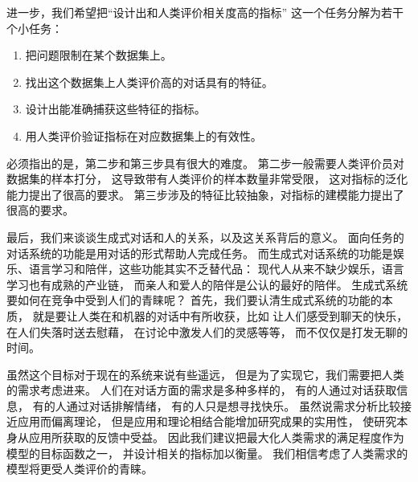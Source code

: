 进一步，我们希望把“设计出和人类评价相关度高的指标”
这一个任务分解为若干个小任务：
\begin{enumerate}
    \item 把问题限制在某个数据集上。
    \item 找出这个数据集上人类评价高的对话具有的特征。
    \item 设计出能准确捕获这些特征的指标。
    \item 用人类评价验证指标在对应数据集上的有效性。
\end{enumerate}

必须指出的是，第二步和第三步具有很大的难度。
第二步一般需要人类评价员对数据集的样本打分，
这导致带有人类评价的样本数量非常受限，
这对指标的泛化能力提出了很高的要求。
第三步涉及的特征比较抽象，对指标的建模能力提出了很高的要求。

最后，我们来谈谈生成式对话和人的关系，以及这关系背后的意义。
面向任务的对话系统的功能是用对话的形式帮助人完成任务。
而生成式对话系统的功能是娱乐、语言学习和陪伴，这些功能其实不乏替代品：
现代人从来不缺少娱乐，语言学习也有成熟的产业链，
而亲人和爱人的陪伴是公认的最好的陪伴。
生成式系统要如何在竞争中受到人们的青睐呢？
首先，我们要认清生成式系统的功能的本质，
就是要让人类在和机器的对话中有所收获，比如
让人们感受到聊天的快乐，
在人们失落时送去慰藉，
在讨论中激发人们的灵感等等，
而不仅仅是打发无聊的时间。

虽然这个目标对于现在的系统来说有些遥远，
但是为了实现它，我们需要把人类的需求考虑进来。
人们在对话方面的需求是多种多样的，
有的人通过对话获取信息，
有的人通过对话排解情绪，
有的人只是想寻找快乐。
虽然说需求分析比较接近应用而偏离理论，
但是应用和理论相结合能增加研究成果的实用性，
使研究本身从应用所获取的反馈中受益。
因此我们建议把最大化人类需求的满足程度作为模型的目标函数之一，
并设计相关的指标加以衡量。
我们相信考虑了人类需求的模型将更受人类评价的青睐。
